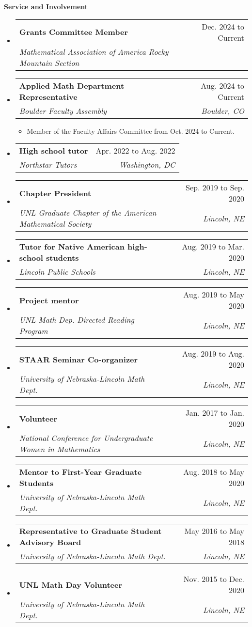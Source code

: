 \documentclass[letterpaper,11pt]{article}
\makeatletter
\newcommand{\resitem}[1]{\item #1 \vspace{-2pt}}
\newcommand{\resheading}[1]{{\large \colorbox{mygrey}{\begin{minipage}{\textwidth}{\textbf{#1 \vphantom{p\^{E}}}}\end{minipage}}}}
\newcommand{\ressubheading}[4]{
\begin{tabular*}{6.5in}{l@{\extracolsep{\fill}}r}
		\textbf{#1} & #2 \\
		\textit{#3} & \textit{#4} \\
\end{tabular*}\vspace{-6pt}}
\makeatother
\begin{document}
\begin{samepage}	
	\resheading{Service and Involvement}
	\begin{itemize}
		\item
		\ressubheading{Grants Committee Member}{Dec. 2024 to Current}{Mathematical Association of America Rocky Mountain Section}{}
		\item
		\ressubheading{Applied Math Department Representative}{Aug. 2024 to Current}{Boulder Faculty Assembly}{Boulder, CO}
		{\footnotesize
			\begin{itemize}
				\resitem{Member of the Faculty Affairs Committee from Oct. 2024 to Current.}
			\end{itemize}
		}
		\item
		\ressubheading{High school tutor}{Apr. 2022 to Aug. 2022}{Northstar Tutors}{Washington, DC}
		\item
		\ressubheading{Chapter President}{Sep. 2019 to Sep. 2020}{UNL Graduate Chapter of the American Mathematical Society}{Lincoln, NE}
		\item 
		\ressubheading{Tutor for Native American high-school students}{Aug. 2019 to Mar. 2020}{Lincoln Public Schools}{Lincoln, NE}
		\item
		\ressubheading{Project mentor}{Aug. 2019 to May 2020}{UNL Math Dep. Directed Reading Program}{Lincoln, NE}
		\item
		\ressubheading{STAAR Seminar Co-organizer}{Aug. 2019 to Aug. 2020}{University of Nebraska-Lincoln Math Dept.}{Lincoln, NE}
		\item
		\ressubheading{Volunteer}{Jan. 2017 to Jan. 2020}{National Conference for Undergraduate Women in Mathematics}{Lincoln, NE}
		\item
		\ressubheading{Mentor to First-Year Graduate Students}{Aug. 2018 to May 2020}{University of Nebraska-Lincoln Math Dept.}{Lincoln, NE}
		\item
		\ressubheading{Representative to Graduate Student Advisory Board}{May 2016 to May 2018}{University of Nebraska-Lincoln Math Dept.}{Lincoln, NE}
		\item
		\ressubheading{UNL Math Day Volunteer}{Nov. 2015 to Dec. 2020}{University of Nebraska-Lincoln Math Dept.}{Lincoln, NE}
		
	\end{itemize}			
\end{samepage}
\end{document}
